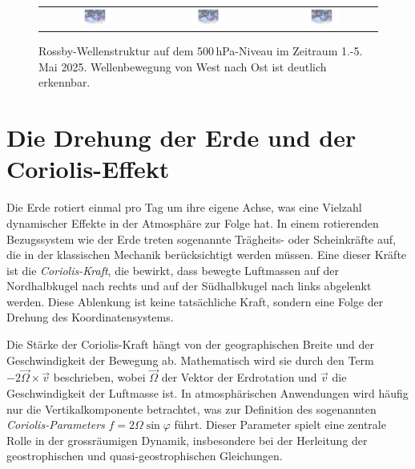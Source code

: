 \begin{refsection}
\begin{figure}
\begin{tabular}{ccc}
            \includegraphics[width=0.32\textwidth, trim=5cm 0cm 5cm 0cm, clip]{papers/rossby/images/weather/data_2025_5_4_00:00_500.pdf} &
            \includegraphics[width=0.32\textwidth, trim=5cm 0cm 5cm 0cm, clip]{papers/rossby/images/weather/data_2025_5_4_12:00_500.pdf} &
            \includegraphics[width=0.32\textwidth, trim=5cm 0cm 5cm 0cm, clip]{papers/rossby/images/weather/data_2025_5_5_00:00_500.pdf} \\
        \end{tabular}
        \caption{Rossby-Wellenstruktur auf dem 500\,hPa-Niveau im Zeitraum 1.-5. Mai 2025. Wellenbewegung von West nach Ost ist deutlich erkennbar.}
        \label{fig:rossby_grid}
    \end{figure}
    

    \section{Die Drehung der Erde und der Coriolis-Effekt}

    Die Erde rotiert einmal pro Tag um ihre eigene Achse, was eine Vielzahl dynamischer Effekte in der Atmosphäre zur Folge hat.  
    In einem rotierenden Bezugssystem wie der Erde treten sogenannte Trägheits- oder Scheinkräfte auf, die in der klassischen Mechanik berücksichtigt werden müssen.  
    Eine dieser Kräfte ist die \emph{Coriolis-Kraft}, die bewirkt, dass bewegte Luftmassen auf der Nordhalbkugel nach rechts und auf der Südhalbkugel nach links abgelenkt werden.  
    Diese Ablenkung ist keine tatsächliche Kraft, sondern eine Folge der Drehung des Koordinatensystems.  
    
    Die Stärke der Coriolis-Kraft hängt von der geographischen Breite und der Geschwindigkeit der Bewegung ab.  
    Mathematisch wird sie durch den Term $-2\vec{\Omega} \times \vec{v}$ beschrieben, wobei $\vec{\Omega}$ der Vektor der Erdrotation und $\vec{v}$ die Geschwindigkeit der Luftmasse ist.  
    In atmosphärischen Anwendungen wird häufig nur die Vertikalkomponente betrachtet, was zur Definition des sogenannten \emph{Coriolis-Parameters} $f = 2\Omega \sin \varphi$ führt.  
    Dieser Parameter spielt eine zentrale Rolle in der grossräumigen Dynamik, insbesondere bei der Herleitung der geostrophischen und quasi-geostrophischen Gleichungen.  
    

\end{refsection}
